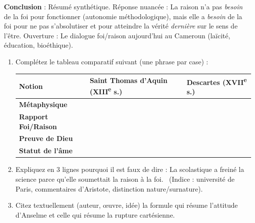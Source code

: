 \documentclass[11pt]{article}
\begin{document}
\begin{exoresolu}
\textbf{Conclusion} : Résumé synthétique. Réponse nuancée : La raison n'a pas \emph{besoin} de la foi pour fonctionner (autonomie méthodologique), mais elle a \emph{besoin} de la foi pour ne pas s'absolutiser et pour atteindre la vérité \emph{dernière} sur le sens de l'être. Ouverture : Le dialogue foi/raison aujourd'hui au Cameroun (laïcité, éducation, bioéthique).
\end{exoresolu}

\begin{exercice}
\begin{enumerate}
    \item Complétez le tableau comparatif suivant (une phrase par case) :
\begin{center}
\begin{tabularx}{\linewidth}{|l|X|X|}
\hline
\rowcolor{popblueL}
\textbf{Notion} & \textbf{Saint Thomas d'Aquin (XIII\textsuperscript{e} s.)} & \textbf{Descartes (XVII\textsuperscript{e} s.)} \\
\hline
\bfseries Métaphysique & & \\
\hline
\bfseries Rapport Foi/Raison & & \\
\hline
\bfseries Preuve de Dieu & & \\
\hline
\bfseries Statut de l'âme & & \\
\hline
\end{tabularx}
\end{center}
    \item Expliquez en 3 lignes pourquoi il est faux de dire : \guillemotleft La scolastique a freiné la science parce qu'elle soumettait la raison à la foi. \guillemotright\ (Indice : université de Paris, commentaires d'Aristote, distinction nature/surnature).
    \item Citez textuellement (auteur, œuvre, idée) la formule qui résume l'attitude d'Anselme et celle qui résume la rupture cartésienne.
\end{enumerate}
\end{exercice}
\end{document}
